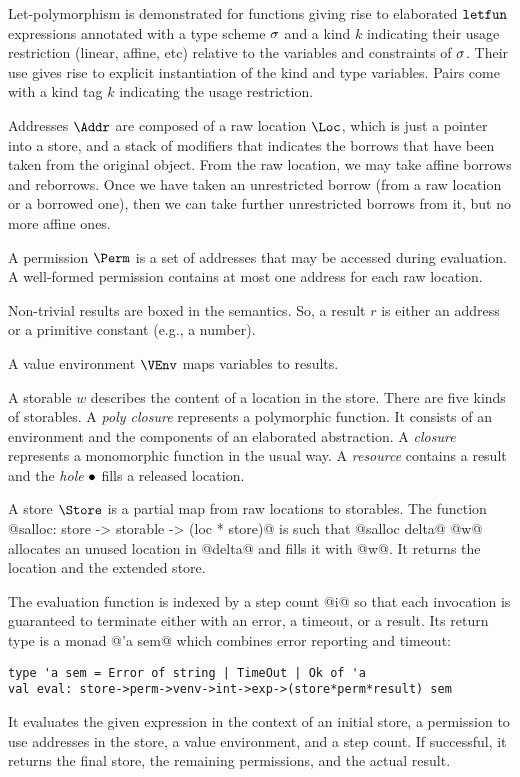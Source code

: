 Let-polymorphism is demonstrated for functions giving rise to elaborated
$\mathtt{letfun}$ expressions annotated with a type scheme $\sigma$ and a kind $k$ indicating their
usage restriction (linear, affine, etc) relative to the variables and
constraints of $\sigma$. Their use
gives rise to explicit instantiation of the kind and type variables.
Pairs come with a kind tag $k$ indicating the usage restriction.

Addresses $\Addr$ are composed of a raw location $\Loc$, which is just
a pointer into a store, and a stack of modifiers that indicates the
borrows that have been taken from the original object. From the raw
location, we may take affine borrows and reborrows. Once we have
taken an unrestricted borrow (from a raw location or a borrowed one),
then we can take further unrestricted borrows from it, but no more
affine ones.

A permission $\Perm$ is a set of addresses that may be accessed during
evaluation. A well-formed permission contains at most one address for each raw
location.

Non-trivial results are boxed in the  semantics. So, a result
$r$ is either an address or a primitive constant (e.g., a number).

A value environment $\VEnv$  maps variables to results.

A storable $w$ describes the content of a location in the store. There are five
kinds of storables. A \emph{poly closure} represents a polymorphic
function. It consists of an environment and the components of an
elaborated abstraction. A \emph{closure} represents a monomorphic
function in the usual way.
A \emph{resource} contains
a result and the \emph{hole} $\bullet$ fills a released location.

A store $\Store$ is a partial map from raw locations to
storables. The function
@salloc: store -> storable -> (loc * store)@ is such that
@salloc delta@ @w@ allocates an unused location in @delta@ and fills it with
@w@. It returns the location and the extended store.


The evaluation function is indexed by a step count @i@ so that each
invocation is guaranteed to terminate either with an error, a timeout,
or a result. Its return type is a monad
@'a sem@ which combines error reporting and timeout:
\begin{lstlisting}
type 'a sem = Error of string | TimeOut | Ok of 'a
val eval: store->perm->venv->int->exp->(store*perm*result) sem
\end{lstlisting}
It evaluates the given expression in the context of an initial store, a
permission to use addresses in the store, a value environment, and a
step count. If successful, it returns the final store, the remaining
permissions, and the actual result.

